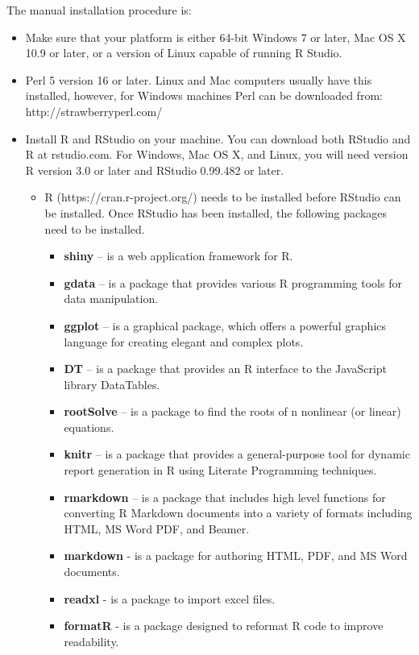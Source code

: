 \documentclass[journal]{IEEEtran}
\begin{document}
The manual installation procedure is:
\begin{itemize}
  \item {Make sure that your platform is either 64-bit Windows 7 or later, Mac OS X 10.9 or later, or a version of Linux capable of running R Studio.}
  \item {Perl 5 version 16 or later. Linux and Mac computers usually have this installed, however, for Windows machines Perl can be downloaded from: http://strawberryperl.com/}
  \item {Install R and RStudio on your machine. You can download both RStudio and R at rstudio.com. For Windows, Mac OS X, and Linux, you will need version R version 3.0 or later and RStudio 0.99.482 or later.
      \begin{itemize}
        \item {R (https://cran.r-project.org/) needs to be installed before RStudio can be installed. Once RStudio has been installed, the following packages need to be installed.
        \begin{itemize}
          \item {\textbf{shiny} – is a web application framework for R.}
          \item {\textbf{gdata} – is a package that provides various R programming tools for data manipulation.}
          \item {\textbf{ggplot} – is a graphical package, which offers a powerful graphics language for creating elegant and complex plots.}
          \item {\textbf{DT} – is a package that provides an R interface to the JavaScript library DataTables.}
          \item {\textbf{rootSolve} – is a package to find the roots of n nonlinear (or linear) equations.}
          \item {\textbf{knitr} – is a package that provides a general-purpose tool for dynamic report generation in R using Literate Programming techniques.}
          \item {\textbf{rmarkdown} – is a package that includes high level functions for converting R Markdown documents into a variety of formats including HTML, MS Word PDF, and Beamer.}
          \item {\textbf{markdown} - is a package for authoring HTML, PDF, and MS Word documents.}
          \item {\textbf{readxl} - is a package to import excel files.}
          \item {\textbf{formatR} - is a package designed to reformat R code to improve readability.}       

\end{itemize}}
\end{itemize}}
\end{itemize}
\end{document}
